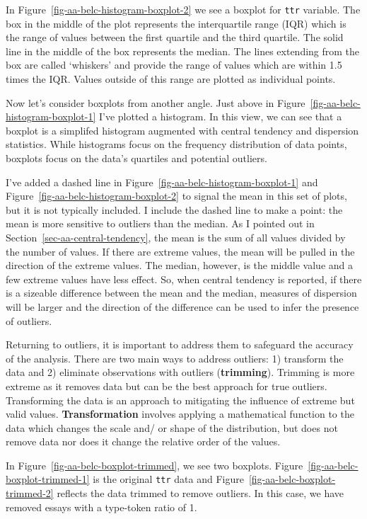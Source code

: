 \documentclass[
  letterpaper,
  DIV=11,
  numbers=noendperiod]{scrreprt}
\theoremstyle{definition}
\theoremstyle{remark}
\begin{document}
In Figure~\ref{fig-aa-belc-histogram-boxplot-2} we see a boxplot for
\texttt{ttr} variable. The box in the middle of the plot represents the
interquartile range (IQR) which is the range of values between the first
quartile and the third quartile. The solid line in the middle of the box
represents the median. The lines extending from the box are called
`whiskers' and provide the range of values which are within 1.5 times
the IQR. Values outside of this range are plotted as individual points.

Now let's consider boxplots from another angle. Just above in
Figure~\ref{fig-aa-belc-histogram-boxplot-1} I've plotted a histogram.
In this view, we can see that a boxplot is a simplifed histogram
augmented with central tendency and dispersion statistics. While
histograms focus on the frequency distribution of data points, boxplots
focus on the data's quartiles and potential outliers.

I've added a dashed line in Figure~\ref{fig-aa-belc-histogram-boxplot-1}
and Figure~\ref{fig-aa-belc-histogram-boxplot-2} to signal the mean in
this set of plots, but it is not typically included. I include the
dashed line to make a point: the mean is more sensitive to outliers than
the median. As I pointed out in Section~\ref{sec-aa-central-tendency},
the mean is the sum of all values divided by the number of values. If
there are extreme values, the mean will be pulled in the direction of
the extreme values. The median, however, is the middle value and a few
extreme values have less effect. So, when central tendency is reported,
if there is a sizeable difference between the mean and the median,
measures of dispersion will be larger and the direction of the
difference can be used to infer the presence of outliers.

Returning to outliers, it is important to address them to safeguard the
accuracy of the analysis. There are two main ways to address outliers:
1) transform the data and 2) eliminate observations with outliers
(\textbf{trimming}). Trimming is more extreme as it removes data but can
be the best approach for true outliers. Transforming the data is an
approach to mitigating the influence of extreme but valid values.
\textbf{Transformation} involves applying a mathematical function to the
data which changes the scale and/ or shape of the distribution, but does
not remove data nor does it change the relative order of the values.

In Figure~\ref{fig-aa-belc-boxplot-trimmed}, we see two boxplots.
Figure~\ref{fig-aa-belc-boxplot-trimmed-1} is the original \texttt{ttr}
data and Figure~\ref{fig-aa-belc-boxplot-trimmed-2} reflects the data
trimmed to remove outliers. In this case, we have removed essays with a
type-token ratio of 1.
\end{document}
